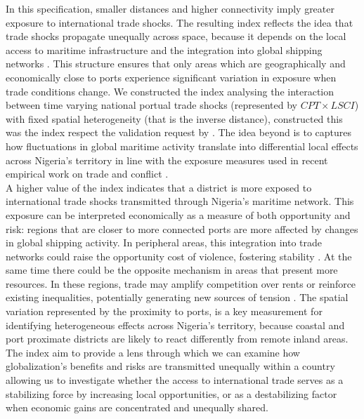 In this specification, smaller distances and higher connectivity imply greater exposure to international trade shocks. The resulting index reflects the idea that trade shocks propagate unequally across space, because it depends on the local access to maritime infrastructure and the integration into global shipping networks \parencite{berman2015external, dube2013commodity}.
This structure ensures that only areas which are geographically and economically close to ports experience significant variation in exposure when trade conditions change.
We constructed the index analysing the interaction between time varying national portual trade shocks (represented by $CPT \times LSCI$) with fixed spatial heterogeneity (that is the inverse distance), constructed this was the index respect the validation request by \textcite{goldsmith2020bartik}. The idea beyond is to captures how fluctuations in global maritime activity translate into differential local effects across Nigeria’s territory in line with the exposure measures used in recent empirical work on trade and conflict \parencite{berman2015external}. \\
A higher value of the index indicates that a district is more exposed to international trade shocks transmitted through Nigeria’s maritime network. This exposure can be interpreted economically as a measure of both opportunity and risk: regions that are closer to more connected ports are more affected by changes in global shipping activity. In peripheral areas, this integration into trade networks could raise the opportunity cost of violence, fostering stability \parencite{berman2015external}. At the same time there could be the opposite mechanism in areas that present more resources. In these regions, trade may amplify competition over rents or reinforce existing inequalities, potentially generating new sources of tension \parencite{dube2013commodity, michalopoulos2013pre}. The spatial variation represented by the proximity to ports, is a key measurement for identifying heterogeneous effects across Nigeria’s territory, because coastal and port proximate districts are likely to react differently from remote inland areas. 
The index aim to provide a lens through which we can examine how globalization’s benefits and risks are transmitted unequally within a country allowing us to investigate whether the access to international trade serves as a stabilizing force by increasing local opportunities, or as a destabilizing factor when economic gains are concentrated and unequally shared.\\

